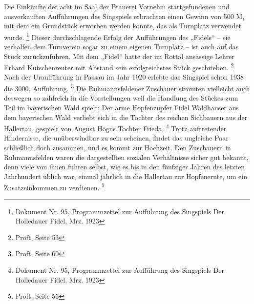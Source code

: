 \documentclass[a4paper]{article}
\begin{document}
Die Einkünfte der acht im Saal der Brauerei Vornehm stattgefundenen und
ausverkauften Aufführungen des Singspiels erbrachten einen Gewinn von
500 M, mit dem ein Grundstück erworben werden konnte, das als Turnplatz
verwendet wurde. \footnote{Dokument Nr. 95, Programmzettel zur
Aufführung des Singspiels {\textquotedbl}Der Holledauer
Fidel{\textquotedbl}, Mrz. 1923} Dieser durchschlagende Erfolg der
Aufführungen des „Fidels“ – sie verhalfen dem Turnverein sogar zu einem
eigenen Turnplatz – ist auch auf das Stück zurückzuführen. Mit dem
„Fidel“ hatte der im Rottal ansässige Lehrer Erhard Kutschenreuter mit
Abstand sein erfolgreichstes Stück geschrieben. \footnote{Proft, Seite
53} Nach der Uraufführung in Passau im Jahr 1920 erlebte das Singspiel
schon 1938 die 3000. Aufführung. \footnote{Proft, Seite 60} Die
Ruhmannsfeldener Zuschauer strömten vielleicht auch deswegen so
zahlreich in die Vorstellungen weil die Handlung des Stückes zum Teil
im bayerischen Wald spielt: Der arme Hopfenzupfer Fidel Waldhauser aus
dem bayerischen Wald verliebt sich in die Tochter des reichen
Sichbauern aus der Hallertau, gespielt von August Högns Tochter
Frieda. \footnote{Dokument Nr. 95, Programmzettel zur Aufführung des
Singspiels {\textquotedbl}Der Holledauer Fidel{\textquotedbl}, Mrz.
1923} Trotz auftretender Hindernisse, die unüberwindbar zu sein
scheinen, findet das ungleiche Paar schließlich doch zusammen, und es
kommt zur Hochzeit. Den Zuschauern in Ruhmannsfelden waren die
dargestellten sozialen Verhältnisse sicher gut bekannt, denn viele von
ihnen fuhren selbst, wie es bis in den fünfziger Jahren des letzten
Jahrhundert üblich war, einmal jährlich in die Hallertau zur
Hopfenernte, um ein Zusatzeinkommen zu verdienen. \footnote{Proft,
Seite 56}
\end{document}
